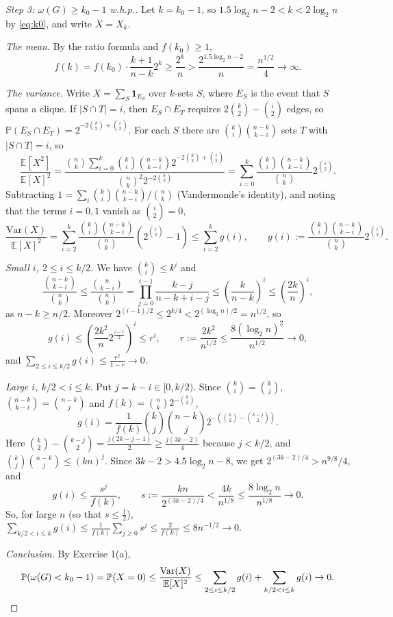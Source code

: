 \documentclass[a4paper,12pt]{article}
\newcommand{\card}[1]{\left| #1 \right|}
\newcommand{\mb}[1]{\mathbb{#1}}
\begin{document}
\begin{proof}[Step 3: $\omega(G) \ge k_0 - 1$ w.h.p.]
	Let $k = k_0 - 1$, so $1.5 \log_2 n - 2 < k < 2 \log_2 n$ by \eqref{eq:k0}, and write $X = X_k$.

	\emph{The mean.} By the ratio formula and $f(k_0) \ge 1$,
	\[
		f(k) = f(k_0) \cdot \frac{k+1}{n-k} 2^{k} \ge \frac{2^k}{n} > \frac{2^{1.5 \log_2 n - 2}}{n} = \frac{n^{1/2}}{4} \to \infty.
	\]

	\emph{The variance.} Write $X = \sum_S \mathbf 1_{E_S}$ over $k$-sets $S$, where $E_S$ is the event that $S$ spans a clique. If $\card{S \cap T} = i$, then $E_S \cap E_T$ requires $2\binom k2 - \binom i2$ edges, so $\mb P(E_S \cap E_T) = 2^{-2\binom k2 + \binom i2}$. For each $S$ there are $\binom ki \binom{n-k}{k-i}$ sets $T$ with $\card{S \cap T} = i$, so
	\[
		\frac{\mb E[X^2]}{\mb E[X]^2} = \frac{\binom nk \sum_{i=0}^{k} \binom ki \binom{n-k}{k-i} 2^{-2\binom k2 + \binom i2}}{\binom nk^2 2^{-2\binom k2}} = \sum_{i=0}^k \frac{\binom ki \binom{n-k}{k-i}}{\binom nk} 2^{\binom i2}.
	\]
	Subtracting $1 = \sum_i \binom ki \binom{n-k}{k-i} / \binom nk$ (Vandermonde's identity), and noting that the terms $i = 0, 1$ vanish as $\binom i2 = 0$,
	\[
		\frac{\mathrm{Var}(X)}{\mb E[X]^2} = \sum_{i=2}^k \frac{\binom ki \binom{n-k}{k-i}}{\binom nk} \left( 2^{\binom i2} - 1 \right) \le \sum_{i=2}^k g(i), \qquad g(i) := \frac{\binom ki \binom{n-k}{k-i}}{\binom nk} 2^{\binom i2}.
	\]

	\emph{Small $i$, $2 \le i \le k/2$.} We have $\binom ki \le k^i$ and
	\[
		\frac{\binom{n-k}{k-i}}{\binom nk} \le \frac{\binom{n}{k-i}}{\binom nk} = \prod_{j=0}^{i-1} \frac{k - j}{n - k + i - j} \le \left( \frac{k}{n-k} \right)^i \le \left( \frac{2k}{n} \right)^i,
	\]
	as $n - k \ge n/2$. Moreover $2^{(i-1)/2} \le 2^{k/4} < 2^{(\log_2 n)/2} = n^{1/2}$, so
	\[
		g(i) \le \left( \frac{2k^2}{n} 2^{\frac{i-1}{2}} \right)^i \le r^i, \qquad r := \frac{2k^2}{n^{1/2}} \le \frac{8 (\log_2 n)^2}{n^{1/2}} \to 0,
	\]
	and $\sum_{2 \le i \le k/2} g(i) \le \frac{r^2}{1 - r} \to 0$.

	\emph{Large $i$, $k/2 < i \le k$.} Put $j = k - i \in [0, k/2)$. Since $\binom ki = \binom kj$, $\binom{n-k}{k-i} = \binom{n-k}{j}$ and $f(k) = \binom nk 2^{-\binom k2}$,
	\[
		g(i) = \frac{1}{f(k)} \binom kj \binom{n-k}{j} 2^{-\left( \binom k2 - \binom{k-j}{2} \right)}.
	\]
	Here $\binom k2 - \binom{k-j}2 = \frac{j(2k - j - 1)}{2} \ge \frac{j(3k - 2)}{4}$ because $j < k/2$, and $\binom kj \binom{n-k}{j} \le (kn)^j$. Since $3k - 2 > 4.5 \log_2 n - 8$, we get $2^{(3k-2)/4} > n^{9/8}/4$, and
	\[
		g(i) \le \frac{s^j}{f(k)}, \qquad s := \frac{kn}{2^{(3k-2)/4}} < \frac{4k}{n^{1/8}} \le \frac{8 \log_2 n}{n^{1/8}} \to 0.
	\]
	So, for large $n$ (so that $s \le \frac12$), $\sum_{k/2 < i \le k} g(i) \le \frac{1}{f(k)} \sum_{j \ge 0} s^j \le \frac{2}{f(k)} \le 8 n^{-1/2} \to 0$.

	\emph{Conclusion.} By Exercise 1(a),
	\[
		\mb P(\omega(G) < k_0 - 1) = \mb P(X = 0) \le \frac{\mathrm{Var}(X)}{\mb E[X]^2} \le \sum_{2 \le i \le k/2} g(i) + \sum_{k/2 < i \le k} g(i) \to 0. \qedhere
	\]
\end{proof}
\end{document}
